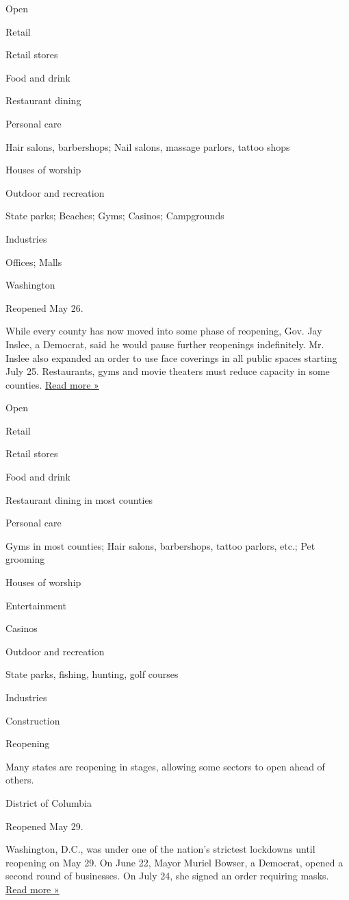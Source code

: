 Open

Retail

Retail stores

Food and drink

Restaurant dining

Personal care

Hair salons, barbershops; Nail salons, massage parlors, tattoo shops

Houses of worship

Outdoor and recreation

State parks; Beaches; Gyms; Casinos; Campgrounds

Industries

Offices; Malls

Washington

Reopened May 26.

While every county has now moved into some phase of reopening, Gov. Jay
Inslee, a Democrat, said he would pause further reopenings indefinitely.
Mr. Inslee also expanded an order to use face coverings in all public
spaces starting July 25. Restaurants, gyms and movie theaters must
reduce capacity in some counties.
\href{https://www.seattlepi.com/coronavirus/article/inslee-extends-phase-pause-indefinitely-wa-state-15441125.php}{Read
more »}

Open

Retail

Retail stores

Food and drink

Restaurant dining in most counties

Personal care

Gyms in most counties; Hair salons, barbershops, tattoo parlors, etc.;
Pet grooming

Houses of worship

Entertainment

Casinos

Outdoor and recreation

State parks, fishing, hunting, golf courses

Industries

Construction

Reopening

Many states are reopening in stages, allowing some sectors to open ahead
of others.

District of Columbia

Reopened May 29.

Washington, D.C., was under one of the nation's strictest lockdowns
until reopening on May 29. On June 22, Mayor Muriel Bowser, a Democrat,
opened a second round of businesses. On July 24, she signed an order
requiring masks.
\href{https://dcist.com/story/20/07/29/d-c-just-made-it-harder-to-move-to-phase-three-of-reopening/}{Read
more »}

